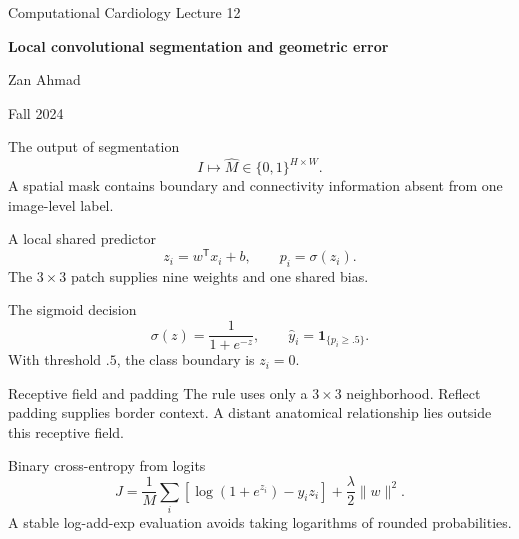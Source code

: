 \documentclass[aspectratio=169,11pt]{beamer}
\newcommand{\notestarget}{notes.pdf}\newcommand{\noteslabel}{Notes}
\begin{document}
\begin{frame}[plain]\vfill
{\small\color{accent} Computational Cardiology \quad Lecture 12}\par\medskip
{\raggedright{}\LARGE\bfseries\color{ink} Local convolutional segmentation and geometric error}\par\bigskip
Zan Ahmad\par\smallskip
{\small Fall 2024}\par\vfill\end{frame}
\renewcommand{\notestarget}{notes.pdf\#note-pixelwise-prediction-and-comparison-units}
\begin{frame}[t,fragile,label=slide-the-output-of-segmentation]{The output of segmentation}
\[I\longmapsto\widehat M\in\{0,1\}^{H\times W}.\]\pause{} A spatial mask contains boundary and connectivity information absent from one image-level label.
\end{frame}
\renewcommand{\notestarget}{notes.pdf\#note-a-shared-local-linear-predictor}
\begin{frame}[t,fragile,label=slide-a-local-shared-predictor]{A local shared predictor}
\[z_i=w^{\mathsf T}x_i+b,\qquad p_i=\sigma(z_i).\]\pause{} The $3\times3$ patch supplies nine weights and one shared bias.
\end{frame}
\renewcommand{\notestarget}{notes.pdf\#note-a-shared-local-linear-predictor}
\begin{frame}[t,fragile,label=slide-the-sigmoid-decision]{The sigmoid decision}
\[\sigma(z)=\frac1{1+e^{-z}},\qquad\widehat y_i=\boldsymbol1_{\{p_i\ge.5\}}.\]\pause{} With threshold $.5$, the class boundary is $z_i=0$.
\end{frame}
\renewcommand{\notestarget}{notes.pdf\#note-a-shared-local-linear-predictor}
\begin{frame}[t,fragile,label=slide-receptive-field-and-padding]{Receptive field and padding}
The rule uses only a $3\times3$ neighborhood. Reflect padding supplies border context.\pause{} A distant anatomical relationship lies outside this receptive field.
\end{frame}
\renewcommand{\notestarget}{notes.pdf\#note-cross-entropy-and-its-derivatives}
\begin{frame}[t,fragile,label=slide-binary-cross-entropy-from-logits]{Binary cross-entropy from logits}
\[J=\frac1M\sum_i[\log(1+e^{z_i})-y_i z_i]+\frac\lambda2\|w\|^2.\]\pause{} A stable log-add-exp evaluation avoids taking logarithms of rounded probabilities.
\end{frame}
\end{document}
